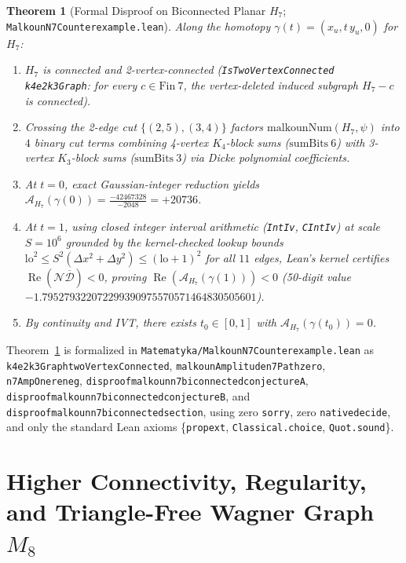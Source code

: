 \documentclass[11pt]{amsart}
\renewcommand{\_}{\origunderscore\penalty0\relax}
\theoremstyle{plain}
\newtheorem{theorem}{Theorem}[section]
\theoremstyle{definition}
\theoremstyle{remark}
\DeclareMathOperator{\RePart}{Re}
\begin{document}
\begin{theorem}[Formal Disproof on Biconnected Planar $H_7$; \texttt{MalkounN7Counterexample.lean}]\label{thm:n7}
Along the homotopy $\gamma(t) = (x_u, t\,y_u, 0)$ for $H_7$:
\begin{enumerate}
    \item $H_7$ is connected and 2-vertex-connected (\texttt{IsTwoVertexConnected k4e2k3Graph}: for every $c \in \mathrm{Fin}\ 7$, the vertex-deleted induced subgraph $H_7 - c$ is connected).
    \item Crossing the 2-edge cut $\{(2,5), (3,4)\}$ factors $\mathrm{malkounNum}(H_7, \psi)$ into $4$ binary cut terms combining 4-vertex $K_4$-block sums ($\mathrm{sumBits}\ 6$) with 3-vertex $K_3$-block sums ($\mathrm{sumBits}\ 3$) via Dicke polynomial coefficients.
    \item At $t = 0$, exact Gaussian-integer reduction yields $\mathcal{A}_{H_7}(\gamma(0)) = \frac{-42467328}{-2048} = +20736$.
    \item At $t = 1$, using closed integer interval arithmetic (\texttt{IntIv}, \texttt{CIntIv}) at scale $S = 10^6$ grounded by the kernel-checked lookup bounds $\mathrm{lo}^2 \le S^2(\Delta x^2 + \Delta y^2) \le (\mathrm{lo}+1)^2$ for all $11$ edges, Lean's kernel certifies $\RePart(\mathcal{N}\overline{\mathcal{D}}) < 0$, proving $\RePart(\mathcal{A}_{H_7}(\gamma(1))) < 0$ (50-digit value $-1.795279322072299390975570571464830505601$).
    \item By continuity and IVT, there exists $t_0 \in [0, 1]$ with $\mathcal{A}_{H_7}(\gamma(t_0)) = 0$.
\end{enumerate}
\end{theorem}

Theorem~\ref{thm:n7} is formalized in \texttt{Matematyka/MalkounN7Counterexample.lean} as \texttt{k4e2k3Graph\_twoVertexConnected}, \texttt{malkounAmplitude\_n7Path\_zero}, \texttt{n7AmpOne\_re\_neg}, \texttt{disproof\_malkoun\_n7\_biconnected\_conjecture\_A}, \texttt{disproof\_malkoun\_n7\_biconnected\_conjecture\_B}, and \texttt{disproof\_malkoun\_n7\_biconnected\_section\_6}, using zero \texttt{sorry}, zero \texttt{native\_decide}, and only the standard Lean axioms \{\texttt{propext}, \texttt{Classical.choice}, \texttt{Quot.sound}\}.

\section{Higher Connectivity, Regularity, and Triangle-Free Wagner Graph $M_8$}\label{sec:taxonomy}
\end{document}
